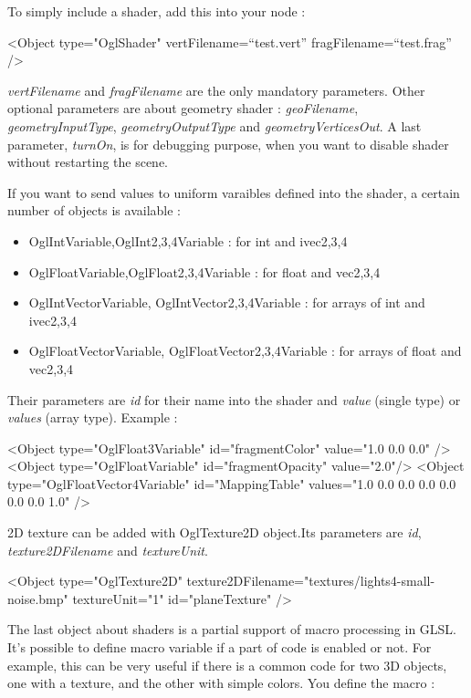 To simply include a shader, add this into your node :
	\begin{code_xml}
		<Object type="OglShader" vertFilename=``test.vert'' fragFilename=``test.frag'' />
	\end{code_xml}

\textit{vertFilename} and \textit{fragFilename} are the only mandatory parameters. Other optional parameters are about geometry shader : \textit{geoFilename}, \textit{geometryInputType}, \textit{geometryOutputType} and \textit{geometryVerticesOut}. A last parameter, \textit{turnOn}, is for debugging purpose, when you want to disable shader without restarting the scene.

If you want to send values to uniform varaibles defined into the shader, a certain number of objects is available : 
\begin{itemize}
 \item OglIntVariable,OglInt{2,3,4}Variable : for int and ivec{2,3,4}
 \item OglFloatVariable,OglFloat{2,3,4}Variable : for float and vec{2,3,4}
 \item OglIntVectorVariable, OglIntVector{2,3,4}Variable : for arrays of int and ivec{2,3,4}
 \item OglFloatVectorVariable, OglFloatVector{2,3,4}Variable : for arrays of float and vec{2,3,4}
\end{itemize}

Their parameters are \textit{id} for their name into the shader and \textit{value} (single type) or \textit{values} (array type).
Example : 
	\begin{code_xml}
		<Object type="OglFloat3Variable" id="fragmentColor" value="1.0 0.0 0.0" />
		<Object type="OglFloatVariable" id="fragmentOpacity" value="2.0"/>
		<Object type="OglFloatVector4Variable" id="MappingTable" values="1.0 0.0 0.0 0.0 0.0 0.0 0.0 1.0" />
	\end{code_xml}

2D texture can be added with OglTexture2D object.Its parameters are \textit{id}, \textit{texture2DFilename} and \textit {textureUnit}.

	\begin{code_xml} 
		<Object type="OglTexture2D" texture2DFilename="textures/lights4-small-noise.bmp" textureUnit="1" id="planeTexture" />
	\end{code_xml}

\newpage

The last object about shaders is a partial support of macro processing in GLSL. It's possible to define macro variable if a part of code is enabled or not. For example, this can be very useful if there is a common code for two 3D objects, one with a texture, and the other with simple colors. You define the macro :

